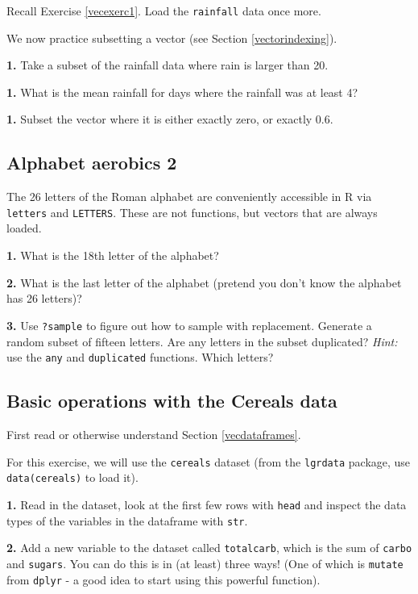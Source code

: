 \documentclass[]{book}
\begin{document}
Recall Exercise \ref{vecexerc1}. Load the \texttt{rainfall} data once more.

We now practice subsetting a vector (see Section \ref{vectorindexing}).

\textbf{1.} Take a subset of the rainfall data where rain is larger than 20.

\textbf{1.} What is the mean rainfall for days where the rainfall was at least 4?

\textbf{1.} Subset the vector where it is either exactly zero, or exactly 0.6.

\hypertarget{alphabet-aerobics-2}{%
\subsection{Alphabet aerobics 2}\label{alphabet-aerobics-2}}

The 26 letters of the Roman alphabet are conveniently accessible in R via \texttt{letters} and \texttt{LETTERS}. These are not functions, but vectors that are always loaded.

\textbf{1.} What is the 18th letter of the alphabet?

\textbf{2.} What is the last letter of the alphabet (pretend you don't know the alphabet has 26 letters)?

\textbf{3.} Use \texttt{?sample} to figure out how to sample with replacement. Generate a random subset of fifteen letters. Are any letters in the subset duplicated? \emph{Hint:} use the \texttt{any} and \texttt{duplicated} functions. Which letters?

\hypertarget{basic-operations-with-the-cereals-data}{%
\subsection{Basic operations with the Cereals data}\label{basic-operations-with-the-cereals-data}}

First read or otherwise understand Section \ref{vecdataframes}.

For this exercise, we will use the \texttt{cereals} dataset (from the \texttt{lgrdata} package, use \texttt{data(cereals)} to load it).

\textbf{1.} Read in the dataset, look at the first few rows with \texttt{head} and inspect the data types of the variables in the dataframe with \texttt{str}.

\textbf{2.} Add a new variable to the dataset called \texttt{totalcarb}, which is the sum of \texttt{carbo} and \texttt{sugars}. You can do this is in (at least) three ways! (One of which is \texttt{mutate} from \texttt{dplyr} - a good idea to start using this powerful function).
\end{document}
